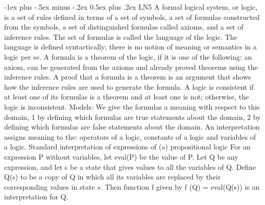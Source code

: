 \documentclass[letterpaper, 8pt]{extarticle}
\makeatletter
\renewcommand{\section}{\@startsection{section}{1}{0mm}%
                                {-1ex plus -.5ex minus -.2ex}%
                                {0.5ex plus .2ex}%
                                {\normalfont\normalsize\bfseries}}
\makeatother
\begin{document}
\begin{multicols*}{3}
    \section{LN5}
    A formal logical system, or logic, is a set of rules defined in terms
    of a set of symbols, a set of formulas constructed from the symbols,
    a set of distinguished formulas called axioms, and a set of inference rules.
    The set of formulas is called the language of the logic.
    The language is defined syntactically;
    there is no notion of meaning or semantics in a logic per se.
    A formula is a theorem of the logic, if it is one of the following:
    an axiom, can be generated from the axioms and already proved theorems
    using the inference rules.
    A proof that a formula is a theorem is an argument that shows
    how the inference rules are used to generate the formula.
    A logic is consistent if at least one of its formulas is a theorem
    and at least one is not; otherwise, the logic is inconsistent.
    Models: We give the formulas a meaning with respect to this domain,
    1 by defining which formulas are true statements about the domain,
    2 by defining which formulas are false statements about the domain.
    An interpretation assigns meaning to the: operators of a logic,
    constants of a logic and variables of a logic.
    Standard interpretation of expressions of
    (a) propositional logic For an expression P without variables,
    let eval(P) be the value of P. Let Q be any expression,
    and let s be a state that gives values to all the variables of Q.
    Define Q(s) to be a copy of Q in which all its variables are
    replaced by their corresponding values in state $s$.
    Then function f given by f (Q) = eval(Q(s)) is an interpretation for Q.\\


\end{multicols*}
\end{document}

